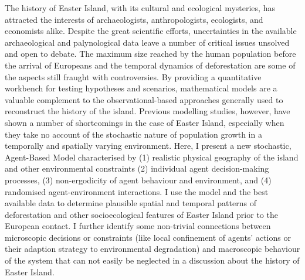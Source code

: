 
The history of Easter Island, with its cultural and ecological mysteries, has attracted the interests of archaeologists, anthropologists, ecologists, and econo\-mists alike. Despite the great scientific efforts, uncertainties in the available archaeological and palynological data leave a number of critical issues unsolved and open to debate. The maximum size reached by the human population before the arrival of Europeans and the temporal dynamics of deforestation are some of the aspects still fraught with controversies. By providing a quantitative workbench for testing hypotheses and scenarios, mathematical models are a valuable complement to the observational-based approaches generally used to reconstruct the history of the island. Previous modelling studies, however, have shown a number of shortcomings in the case of Easter Island, especially when they take no account of the stochastic nature of population growth in a temporally and spatially varying environment. Here, I present a new stochastic, Agent-Based Model characterised by (1) realistic physical geography of the island and other environmental constraints (2) individual agent decision-making processes, (3) non-ergodicity of agent behaviour and environment, and (4) randomised agent-environment interactions. I use the model and the best available data to determine plausible spatial and temporal patterns of deforestation and other socioecological features of Easter Island prior to the European contact.%
I further identify some non-trivial connections between microscopic decisions or constraints (like local confinement of agents' actions or their adaption strategy to environmental degradation) and macroscopic behaviour of the system that can not easily be neglected in a discussion about the history of Easter Island.